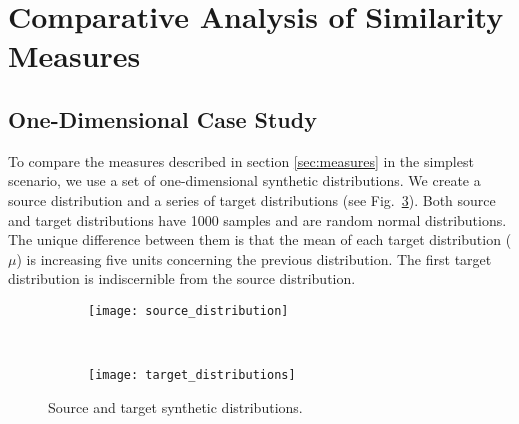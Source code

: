 \section{Comparative Analysis of Similarity Measures}\label{sec:comparison}

\subsection{One-Dimensional Case Study}\label{subsec:1d_case}
To compare the measures described in section \ref{sec:measures} in the simplest scenario, we use a set of one-dimensional synthetic distributions. We create a source distribution and a series of target distributions (see Fig.\ \ref{fig:source_target_dist}). Both source and target distributions have 1000 samples and are random normal distributions. The unique difference between them is that the mean of each target distribution ($\mu$) is increasing five units concerning the previous distribution. The first target distribution is indiscernible from the source distribution.

\begin{figure}[ht] 
	\centering
	\begin{subfigure}[b]{0.45\textwidth}
		\centering
		\texttt{[image: source\_distribution]}	
		\label{fig:source_distribution}
	\end{subfigure}
	~ %
	\begin{subfigure}[b]{0.45\textwidth}
		\centering
		\texttt{[image: target\_distributions]}	
		\label{fig:targert_distributions}
	\end{subfigure}

  \caption{Source and target synthetic distributions.}
  \label{fig:source_target_dist}
\end{figure}


